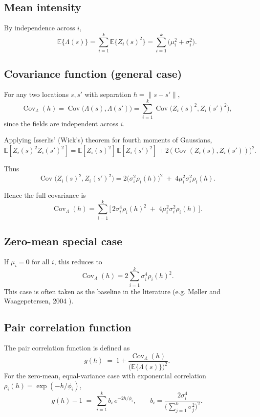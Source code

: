 \documentclass[11pt]{article}
\begin{document}
\subsection{Mean intensity}
By independence across $i$,
\[
\mathbb{E}\{\Lambda(s)\}
= \sum_{i=1}^k \mathbb{E}\{Z_i(s)^2\}
= \sum_{i=1}^k \big(\mu_i^2 + \sigma_i^2\big).
\]

\subsection{Covariance function (general case)}
For any two locations $s,s'$ with separation $h=\|s-s'\|$,
\[
\operatorname{Cov}_\Lambda(h) 
= \operatorname{Cov}\!\big(\Lambda(s), \Lambda(s')\big)
= \sum_{i=1}^k \operatorname{Cov}\!\big(Z_i(s)^2, Z_i(s')^2\big),
\]
since the fields are independent across $i$.

Applying Isserlis’ (Wick’s) theorem for fourth moments of Gaussians,
\[
\mathbb{E}[Z_i(s)^2 Z_i(s')^2]
= \mathbb{E}[Z_i(s)^2]\,\mathbb{E}[Z_i(s')^2]
+ 2\,\big(\operatorname{Cov}(Z_i(s),Z_i(s'))\big)^2.
\]

Thus
\[
\operatorname{Cov}\!\big(Z_i(s)^2,Z_i(s')^2\big)
= 2 \big(\sigma_i^2 \rho_i(h)\big)^2 \;+\; 4 \mu_i^2 \sigma_i^2 \rho_i(h).
\]

Hence the full covariance is
\[
\boxed{\;
	\operatorname{Cov}_\Lambda(h) 
	= \sum_{i=1}^k \Big[\,2 \sigma_i^4 \rho_i(h)^2 \;+\; 4 \mu_i^2 \sigma_i^2 \rho_i(h)\,\Big].
	\;}
\]

\subsection{Zero-mean special case}
If $\mu_i=0$ for all $i$, this reduces to
\[
\boxed{\;\;
	\operatorname{Cov}_\Lambda(h) = 2 \sum_{i=1}^k \sigma_i^4 \rho_i(h)^2 .
	\;\;}
\]
This case is often taken as the baseline in the literature (e.g. Møller and Waagepetersen, 2004 \cite{MW2003book}).

\subsection{Pair correlation function}
The pair correlation function is defined as
\[
g(h) \;=\; 1 + \frac{\operatorname{Cov}_\Lambda(h)}{ \big(\mathbb{E}\{\Lambda(s)\}\big)^2 }.
\]
For the zero-mean, equal-variance case with exponential correlation $\rho_i(h) = \exp(-h/\phi_i)$, 
\[
g(h)-1 \;=\; \sum_{i=1}^k b_i \, e^{-2h/\phi_i},
\qquad 
b_i = \frac{2\sigma_i^4}{\Big(\sum_{j=1}^k \sigma_j^2\Big)^2}.
\]
\end{document}
